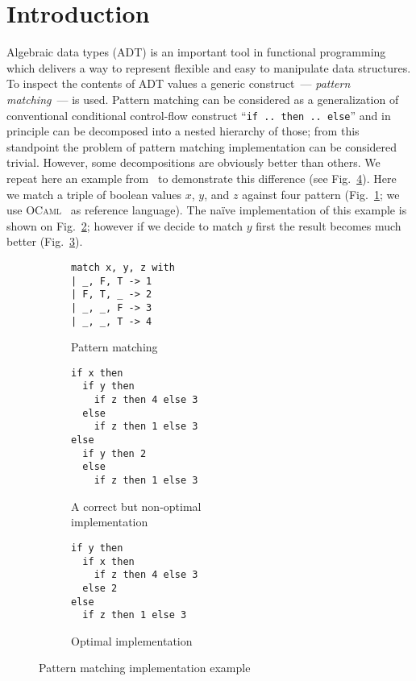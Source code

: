 \section{Introduction}
\label{sec:intro}

Algebraic data types (ADT) is an important tool in functional programming which delivers a way to represent flexible and easy to manipulate data structures.
To inspect the contents of ADT values a generic construct~--- \emph{pattern matching}~--- is used. Pattern matching can be considered as a generalization of
conventional conditional control-flow construct ``\lstinline|if .. then .. else|'' and in principle can be decomposed into a nested hierarchy of those; from
this standpoint the problem of pattern matching implementation can be considered trivial. However, some decompositions are obviously better than others. We
repeat here an example from~\cite{maranget2008} to demonstrate this difference (see Fig.~\ref{fig:match-example}). Here we match a triple of boolean
values $x$, $y$, and $z$ against four pattern (Fig.~\ref{fig:matching-example1}; we use \textsc{OCaml}~\cite{ocaml} as reference language). The na\"{i}ve
implementation of this example is shown on Fig.~\ref{fig:matching-example2}; however if we decide to match $y$ first the result becomes much
better (Fig.~\ref{fig:matching-example3}).

\begin{figure}[ht]
\begin{subfigure}[t]{0.2\linewidth}
\centering
\begin{lstlisting}
match x, y, z with
| _, F, T -> 1
| F, T, _ -> 2
| _, _, F -> 3
| _, _, T -> 4
\end{lstlisting}
\vskip18.5mm
\caption{Pattern matching}
\label{fig:matching-example1}
\end{subfigure}
\hspace{0.5cm}
\begin{subfigure}[t]{0.26\linewidth}
\centering
\begin{lstlisting}
if x then
  if y then
    if z then 4 else 3
  else
    if z then 1 else 3
else
  if y then 2
  else
    if z then 1 else 3
\end{lstlisting}
\caption{A correct but non-optimal\\\phantom{(b)~}implementation}
\label{fig:matching-example2}
\end{subfigure}
\hspace{0.5cm}
\begin{subfigure}[t]{0.33\linewidth}
\centering
\begin{lstlisting}
if y then
  if x then
    if z then 4 else 3
  else 2
else
  if z then 1 else 3
\end{lstlisting}
\vskip13.5mm
\caption{Optimal implementation}
\label{fig:matching-example3}
\end{subfigure}
\caption{Pattern matching implementation example} 
\label{fig:match-example}
\end{figure}

